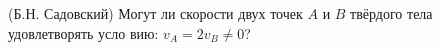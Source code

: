 (Б.Н. Садовский)
Могут ли скорости двух точек $A$ и $B$ твёрдого тела удовлетворять усло
вию: $v_A=2v_B\neq0$?
